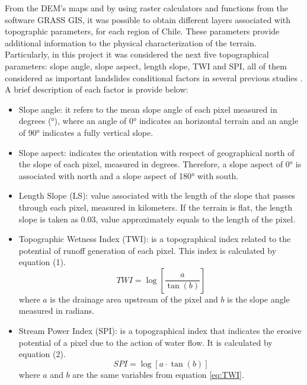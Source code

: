 \documentclass[sigconf, nonacm]{acmart}
\begin{document}
  From the DEM's maps and by using raster calculators and functions from the software GRASS GIS, it was possible to obtain different layers associated with topographic parameters, for each region of Chile. These parameters provide additional information to the physical characterization of the terrain. Particularly, in this project it was considered the next five topographical parameters: slope angle, slope aspect, length slope, TWI and SPI, all of them considered as important landslides conditional factors in several previous studies \cite{abedini2019, pourghasemi2013}. A brief description of each factor is provide below:
\begin{itemize}
    \item Slope angle: it refers to the mean slope angle of each pixel measured in degrees (°), where an angle of 0° indicates an horizontal terrain and an angle of 90° indicates a fully vertical slope.
    \item Slope aspect: indicates the orientation with respect of geographical north of the slope of each pixel, measured in degrees. Therefore, a slope aspect of 0° is associated with north and a slope aspect of 180° with south.
    \item Length Slope (LS): value associated with the length of the slope that passes through each pixel, measured in kilometers. If the terrain is flat, the length slope is taken as 0.03, value approximately equals to the length of the pixel.
    \item Topographic Wetness Index (TWI): is a topographical index related to the potential of runoff generation of each pixel. This index is calculated by equation (1).
    \begin{equation}\label{eq:TWI}
        TWI = \log\left[\frac{a}{\tan(b)}\right]
    \end{equation}
    where $a$ is the drainage area upstream of the pixel and $b$ is the slope angle measured in radians. 
    \item Stream Power Index (SPI): is a topographical index that indicates the erosive potential of a pixel due to the action of water flow. It is calculated by equation (2).
    \begin{equation}
        SPI = \log[a \cdot \tan(b)]
    \end{equation}
    where $a$ and $b$ are the same variables from equation \eqref{eq:TWI}.
\end{itemize}
\end{document}
